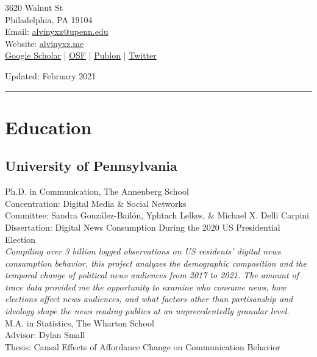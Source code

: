 \documentclass[12pt, letterpaper]{article}
\newcommand{\years}[1]{\marginnote{\normalsize #1}}
\begin{document}
\begin{flushright}
\footnotesize
3620 Walnut St\\
Philadelphia, PA 19104\\
Email: \href{mailto:alvinyxz@upenn.edu}{alvinyxz@upenn.edu}\\
Website: \href{https://alvinyxz.me}{alvinyxz.me}\\
\href{https://scholar.google.com/citations?user=_gHXwrsAAAAJ&hl=en}{Google Scholar} | \href{https://osf.io/utdaf/}{OSF} | \href{https://publons.com/researcher/1698569/alvin-zhou/}{Publon} | \href{https://twitter.com/alvinyxz}{Twitter}
\end{flushright}
 \hfill \footnotesize Updated: February 2021
\bigskip
\hrule
\normalsize

\section*{Education}

\subsection*{University of Pennsylvania}

  \years{Ex. 2022} Ph.D. in Communication, The Annenberg School\\
  Concentration: Digital Media \& Social Networks\\
  Committee: Sandra González-Bailón, Yphtach Lelkes, \& Michael X. Delli Carpini\\
  Dissertation: Digital News Consumption During the 2020 US Presidential Election\\
  \textit{Compiling over 3 billion logged observations on US residents' digital news consumption behavior, this project analyzes the demographic composition and the temporal change of political news audiences from 2017 to 2021. The amount of trace data provided me the opportunity to examine who consume news, how elections affect news audiences, and what factors other than partisanship and ideology shape the news reading publics at an unprecedentedly granular level.}\\
  
  \years{2020} M.A. in Statistics, The Wharton School\\
  Advisor: Dylan Small\\
  Thesis: Causal Effects of Affordance Change on Communication Behavior\\
  
\end{document}
